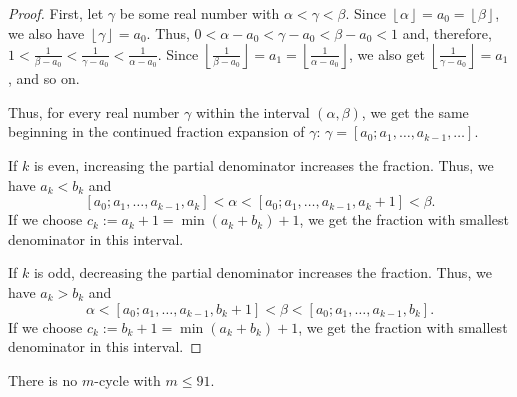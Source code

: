 \documentclass[12pt,reqno]{article}
\newcommand{\floor}[1]{\left\lfloor #1\right\rfloor}
\begin{document}
\begin{proof}
First, let $\gamma$ be some real number with $\alpha<\gamma<\beta$. Since $\floor{\alpha}=a_0=\floor{\beta}$, we also have $\floor{\gamma}=a_0$. Thus, $0<\alpha-a_0<\gamma-a_0<\beta-a_0<1$ and, therefore, $1<\tfrac{1}{\beta-a_0}<\tfrac{1}{\gamma-a_0}<\tfrac{1}{\alpha-a_0}$. Since $\floor{\tfrac{1}{\beta-a_0}}=a_1=\floor{\tfrac{1}{\alpha-a_0}}$, we also get $\floor{\tfrac{1}{\gamma-a_0}}=a_1$, and so on.

Thus, for every real number $\gamma$ within the interval $(\alpha,\beta)$, we get the same beginning in the continued fraction expansion of $\gamma$: $\gamma=[a_0;a_1,\ldots,a_{k-1},\ldots]$. 

If $k$ is even, increasing the partial denominator increases the fraction. Thus, we have $a_k< b_k$ and  \[[a_0;a_1,\ldots,a_{k-1},a_k] < \alpha < [a_0;a_1,\ldots,a_{k-1},a_k+1] < \beta.\] If we choose $c_k:=a_k+1=\min(a_k+b_k)+1$, we get the fraction with smallest denominator in this interval.

If $k$ is odd, decreasing the partial denominator increases the fraction. Thus, we have $a_k>b_k$ and \[\alpha < [a_0;a_1,\ldots,a_{k-1},b_k+1] < \beta < [a_0;a_1,\ldots,a_{k-1},b_k].\]  If we choose $c_k:=b_k+1=\min(a_k+b_k)+1$, we get the fraction with smallest denominator in this interval.
\end{proof}

\begin{theorem}\label{Theorem17}
There is no $m$-cycle with $m\leq 91$.
\end{theorem}
\end{document}
